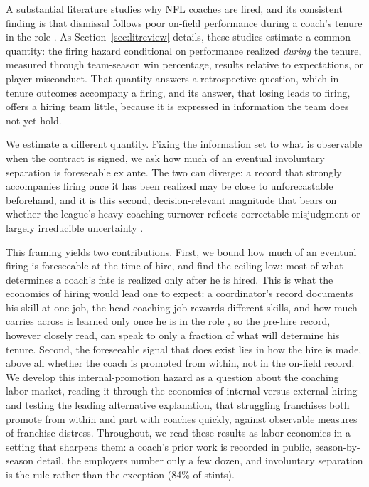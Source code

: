 \documentclass[12pt,USenglish]{article}
\begin{document}
A substantial literature studies why NFL coaches are fired, and its consistent finding is that dismissal follows poor on-field performance during a coach's tenure in the role \citep{allen2012, salaga2020, foreman2019, farnell2021}. As Section~\ref{sec:litreview} details, these studies estimate a common quantity: the firing hazard conditional on performance realized \emph{during} the tenure, measured through team-season win percentage, results relative to expectations, or player misconduct. That quantity answers a retrospective question, which in-tenure outcomes accompany a firing, and its answer, that losing leads to firing, offers a hiring team little, because it is expressed in information the team does not yet hold.

We estimate a different quantity. Fixing the information set to what is observable when the contract is signed, we ask how much of an eventual involuntary separation is foreseeable ex ante. The two can diverge: a record that strongly accompanies firing once it has been realized may be close to unforecastable beforehand, and it is this second, decision-relevant magnitude that bears on whether the league's heavy coaching turnover reflects correctable misjudgment or largely irreducible uncertainty \citep{bryson2024}.

This framing yields two contributions. First, we bound how much of an eventual firing is foreseeable at the time of hire, and find the ceiling low: most of what determines a coach's fate is realized only after he is hired. This is what the economics of hiring would lead one to expect: a coordinator's record documents his skill at one job, the head-coaching job rewards different skills, and how much carries across is learned only once he is in the role \citep{gibbonswaldman2004, farbergibbons1996}, so the pre-hire record, however closely read, can speak to only a fraction of what will determine his tenure. Second, the foreseeable signal that does exist lies in how the hire is made, above all whether the coach is promoted from within, not in the on-field record. We develop this internal-promotion hazard as a question about the coaching labor market, reading it through the economics of internal versus external hiring \citep{chan1996} and testing the leading alternative explanation, that struggling franchises both promote from within and part with coaches quickly, against observable measures of franchise distress. Throughout, we read these results as labor economics in a setting that sharpens them: a coach's prior work is recorded in public, season-by-season detail, the employers number only a few dozen, and involuntary separation is the rule rather than the exception (84\% of stints).
\end{document}
